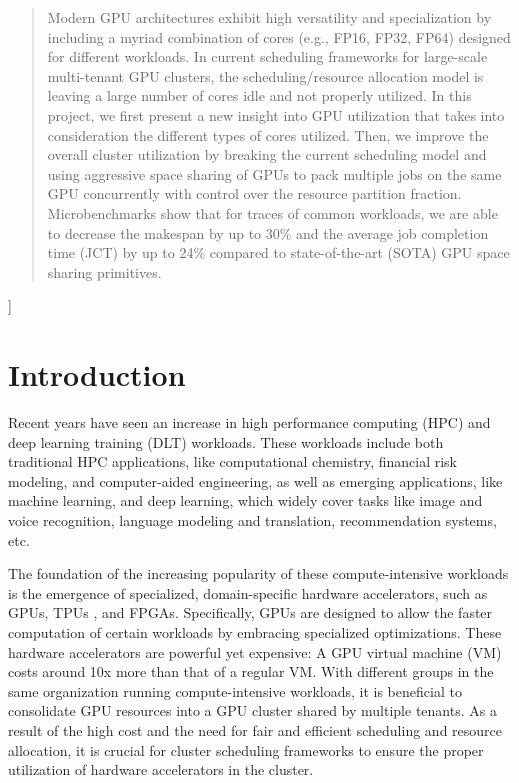 \documentclass{article}
\begin{document}
\begin{abstract}
Modern GPU architectures exhibit high versatility and specialization by including a myriad combination of cores (e.g., FP16, FP32, FP64) designed for different workloads. In current scheduling frameworks for large-scale multi-tenant GPU clusters, the scheduling/resource allocation model is leaving a large number of cores idle and not properly utilized. In this project, we first present a new insight into GPU utilization that takes into consideration the different types of cores utilized. Then, we improve the overall cluster utilization by breaking the current scheduling model and using aggressive space sharing of GPUs to pack multiple jobs on the same GPU concurrently with control over the resource partition fraction. Microbenchmarks show that for traces of common workloads, we are able to decrease the makespan by up to 30\% and the average job completion time (JCT) by up to 24\% compared to state-of-the-art (SOTA) GPU space sharing primitives.
\end{abstract}
]

\printAffiliationsAndNotice{} %

\section{Introduction}
\label{submission}

Recent years have seen an increase in high performance computing (HPC) and deep learning training (DLT) workloads. These workloads include both traditional HPC applications, like computational chemistry, financial risk modeling, and computer-aided engineering, as well as emerging applications, like machine learning, and deep learning, which widely cover tasks like image and voice recognition, language modeling and translation, recommendation systems, etc.

The foundation of the increasing popularity of these compute-intensive workloads is the emergence of specialized, domain-specific hardware accelerators, such as GPUs, TPUs \cite{tpu}, and FPGAs. Specifically, GPUs are designed to allow the faster computation of certain workloads by embracing specialized optimizations. These hardware accelerators are powerful yet expensive: A GPU virtual machine (VM) costs around 10x more than that of a regular VM. With different groups in the same organization running compute-intensive workloads, it is beneficial to consolidate GPU resources into a GPU cluster shared by multiple tenants. As a result of the high cost and the need for fair and efficient scheduling and resource allocation, it is crucial for cluster scheduling frameworks to ensure the proper utilization of hardware accelerators in the cluster.
\end{document}
